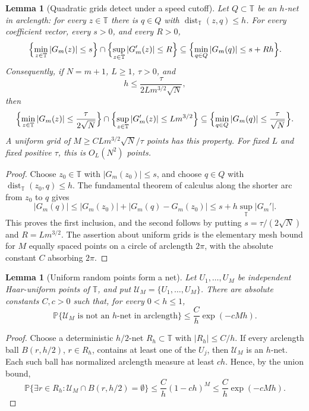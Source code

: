 \documentclass[11pt]{amsart}
\numberwithin{equation}{section}
\newtheorem{lemma}[theorem]{Lemma}
\theoremstyle{definition}
\theoremstyle{remark}
\newcommand{\T}{\mathbb T}
\newcommand{\Prob}{\mathbb P}
\newcommand{\dist}{\operatorname{dist}}
\newcommand{\abs}[1]{\left\lvert #1\right\rvert}
\begin{document}
\begin{lemma}[Quadratic grids detect under a speed cutoff]
\label{lem:grid-speed-detection}
Let \(Q\subset\T\) be an \(h\)-net in arclength: for every \(z\in\T\) there is
\(q\in Q\) with \(\dist_\T(z,q)\le h\).  For every coefficient vector, every
\(s>0\), and every \(R>0\),
\[
  \Bigl\{\min_{z\in\T}\abs{G_m(z)}\le s\Bigr\}
  \cap
  \Bigl\{\sup_{z\in\T}\abs{G_m'(z)}\le R\Bigr\}
  \subseteq
  \Bigl\{\min_{q\in Q}\abs{G_m(q)}\le s+Rh\Bigr\}.
\]
Consequently, if \(N=m+1\), \(L\ge1\), \(\tau>0\), and
\[
  h\le \frac{\tau}{2Lm^{3/2}\sqrt N},
\]
then
\[
  \Bigl\{\min_{z\in\T}\abs{G_m(z)}\le \frac{\tau}{2\sqrt N}\Bigr\}
  \cap
  \Bigl\{\sup_{z\in\T}\abs{G_m'(z)}\le Lm^{3/2}\Bigr\}
  \subseteq
  \Bigl\{\min_{q\in Q}\abs{G_m(q)}\le \frac{\tau}{\sqrt N}\Bigr\}.
\]
A uniform grid of \(M\ge C Lm^{3/2}\sqrt N/\tau\) points has this property.
For fixed \(L\) and fixed positive \(\tau\), this is \(O_L(N^2)\) points.
\end{lemma}

\begin{proof}
Choose \(z_0\in\T\) with \(\abs{G_m(z_0)}\le s\), and choose
\(q\in Q\) with \(\dist_\T(z_0,q)\le h\).  The fundamental theorem of calculus
along the shorter arc from \(z_0\) to \(q\) gives
\[
  \abs{G_m(q)}
  \le \abs{G_m(z_0)}+\abs{G_m(q)-G_m(z_0)}
  \le s+h\sup_{\T}\abs{G_m'}.
\]
This proves the first inclusion, and the second follows by putting
\(s=\tau/(2\sqrt N)\) and \(R=Lm^{3/2}\).  The assertion about uniform grids is
the elementary mesh bound for \(M\) equally spaced points on a circle of
arclength \(2\pi\), with the absolute constant \(C\) absorbing \(2\pi\).
\end{proof}

\begin{lemma}[Uniform random points form a net]\label{lem:uniform-random-net}
Let \(U_1,\ldots,U_M\) be independent Haar-uniform points of \(\T\), and put
\(\mathcal U_M=\{U_1,\ldots,U_M\}\).  There are absolute constants
\(C,c>0\) such that, for every \(0<h\le1\),
\[
  \Prob\{\mathcal U_M\text{ is not an }h\text{-net in arclength}\}
  \le \frac{C}{h}\exp(-cMh).
\]
\end{lemma}

\begin{proof}
Choose a deterministic \(h/2\)-net \(R_h\subset\T\) with
\(|R_h|\le C/h\).  If every arclength ball \(B(r,h/2)\), \(r\in R_h\),
contains at least one of the \(U_j\), then \(\mathcal U_M\) is an \(h\)-net.
Each such ball has normalized arclength measure at least \(c h\).  Hence, by
the union bound,
\[
  \Prob\{\exists r\in R_h:\mathcal U_M\cap B(r,h/2)=\emptyset\}
  \le \frac{C}{h}(1-ch)^M
  \le \frac{C}{h}\exp(-cMh).
\]
\end{proof}
\end{document}
